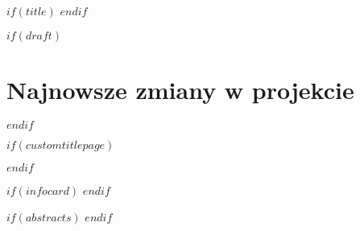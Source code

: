 $if(title)$
$endif$

$if(draft)$
\clearpage

\section*{Najnowsze zmiany w projekcie}
\thispagestyle{empty}
$endif$

$if(customtitlepage)$
\maketitle
$endif$

$if(infocard)$
\makeinfo
$endif$

$if(abstracts)$
\makeabstracts
$endif$

\thispagestyle{empty}
\cleartooddpage
\tableofcontents

\cleartooddpage
